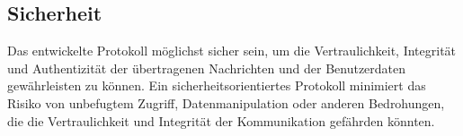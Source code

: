 \subsection{Sicherheit}

Das entwickelte Protokoll möglichst sicher sein, um die Vertraulichkeit, Integrität und Authentizität der übertragenen Nachrichten und der Benutzerdaten gewährleisten zu können. Ein sicherheitsorientiertes Protokoll minimiert das Risiko von unbefugtem Zugriff, Datenmanipulation oder anderen Bedrohungen, die die Vertraulichkeit und Integrität der Kommunikation gefährden könnten.

